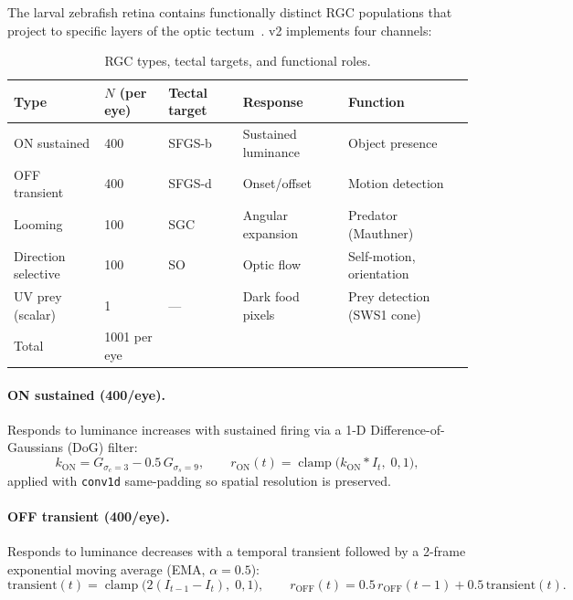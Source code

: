 \documentclass[11pt,a4paper]{article}
\begin{document}
The larval zebrafish retina contains functionally distinct RGC populations
that project to specific layers of the optic tectum~\cite{robles2014,nikolaou2012}.
v2 implements four channels:

\begin{table}[H]
\centering
\caption{RGC types, tectal targets, and functional roles.}
\label{tab:rgc}
\begin{tabular}{llllp{3.5cm}}
\toprule
Type & $N$ (per eye) & Tectal target & Response & Function \\
\midrule
ON sustained        & 400  & SFGS-b & Sustained luminance & Object presence \\
OFF transient       & 400  & SFGS-d & Onset/offset        & Motion detection \\
Looming             & 100  & SGC    & Angular expansion   & Predator (Mauthner) \\
Direction selective & 100  & SO     & Optic flow          & Self-motion, orientation \\
UV prey (scalar)    &   1  & ---    & Dark food pixels    & Prey detection (SWS1 cone) \\
\midrule
Total & 1001 per eye & & & \\
\bottomrule
\end{tabular}
\end{table}

\paragraph{ON sustained (400/eye).}
Responds to luminance increases with sustained firing via a 1-D
Difference-of-Gaussians (DoG) filter:
\begin{equation}\label{eq:dog_on}
  k_\text{ON} = G_{\sigma_c=3} - 0.5\,G_{\sigma_s=9},
  \qquad
  r_\text{ON}(t) = \operatorname{clamp}\!\bigl(k_\text{ON} * I_t,\; 0, 1\bigr),
\end{equation}
applied with \texttt{conv1d} same-padding so spatial resolution is preserved.

\paragraph{OFF transient (400/eye).}
Responds to luminance decreases with a temporal transient followed by a
2-frame exponential moving average (EMA, $\alpha=0.5$):
\begin{equation}\label{eq:off_transient}
  \text{transient}(t) = \operatorname{clamp}\!\bigl(2(I_{t-1} - I_t),\; 0, 1\bigr),
  \qquad
  r_\text{OFF}(t) = 0.5\,r_\text{OFF}(t{-}1) + 0.5\,\text{transient}(t).
\end{equation}
\end{document}
